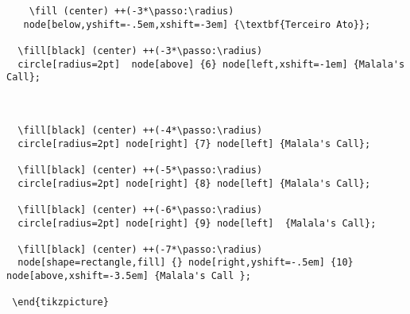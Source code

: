 \begin{verbatim}
    \fill (center) ++(-3*\passo:\radius)
   node[below,yshift=-.5em,xshift=-3em] {\textbf{Terceiro Ato}};
  
  \fill[black] (center) ++(-3*\passo:\radius)
  circle[radius=2pt]  node[above] {6} node[left,xshift=-1em] {Malala's Call};
  


  \fill[black] (center) ++(-4*\passo:\radius)
  circle[radius=2pt] node[right] {7} node[left] {Malala's Call};
  
  \fill[black] (center) ++(-5*\passo:\radius)
  circle[radius=2pt] node[right] {8} node[left] {Malala's Call};
  
  \fill[black] (center) ++(-6*\passo:\radius)
  circle[radius=2pt] node[right] {9} node[left]  {Malala's Call};
  
  \fill[black] (center) ++(-7*\passo:\radius)
  node[shape=rectangle,fill] {} node[right,yshift=-.5em] {10}  node[above,xshift=-3.5em] {Malala's Call };
 
 \end{tikzpicture}
\end{verbatim}



